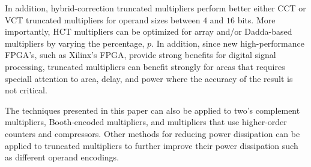 In addition, hybrid-correction truncated 
multipliers perform better either CCT or VCT truncated multipliers for operand sizes
between $4$ and $16$ bits.  More importantly, 
HCT multipliers can be optimized for 
array and/or Dadda-based multipliers by varying the percentage, $p$.
In addition, since new high-performance FPGA's, such as Xilinx's FPGA,
provide strong benefits for digital signal processing, 
truncated multipliers can benefit strongly for areas that
requires speciall attention to area, delay, and power where the accuracy of
the result is not critical.

The techniques presented in this paper can also be applied to 
two's complement multipliers, Booth-encoded multipliers, 
and multipliers that use higher-order counters and compressors. 
Other methods for reducing power dissipation can be applied 
to truncated multipliers to further improve their power 
dissipation such as different operand encodings.




